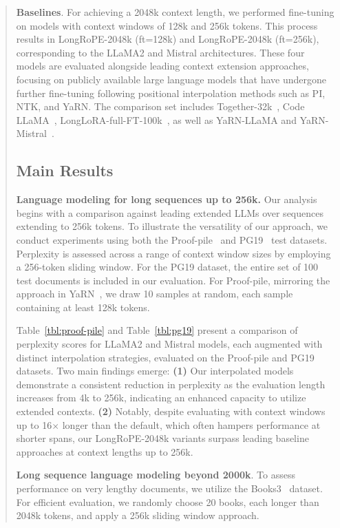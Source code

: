 \begin{abstract}
\textbf{Baselines}. For achieving a 2048k context length, we performed fine-tuning on models with context windows of 128k and 256k tokens. This process results in LongRoPE-2048k (ft=128k) and LongRoPE-2048k (ft=256k), corresponding to the LLaMA2 and Mistral architectures. These four models are evaluated alongside leading context extension approaches, focusing on publicly available large language models that have undergone further fine-tuning following positional interpolation methods such as PI, NTK, and YaRN. The comparison set includes Together-32k~\cite{together}, Code LLaMA~\cite{codellama}, LongLoRA-full-FT-100k~\cite{longlora}, as well as YaRN-LLaMA and YaRN-Mistral~\cite{yarn}.

\subsection{Main Results}

\label{sec:mainresult}
\textbf{Language modeling for long sequences up to 256k.} Our analysis begins with a comparison against leading extended LLMs over sequences extending to 256k tokens. To illustrate the versatility of our approach, we conduct experiments using both the Proof-pile~\cite{pg19} and PG19~\cite{pile} test datasets. Perplexity is assessed across a range of context window sizes by employing a 256-token sliding window. For the PG19 dataset, the entire set of 100 test documents is included in our evaluation. For Proof-pile, mirroring the approach in YaRN~\cite{yarn}, we draw 10 samples at random, each sample containing at least 128k tokens.

Table~\ref{tbl:proof-pile} and Table~\ref{tbl:pg19} present a comparison of perplexity scores for LLaMA2 and Mistral models, each augmented with distinct interpolation strategies, evaluated on the Proof-pile and PG19 datasets. Two main findings emerge: \textbf{(1)} Our interpolated models demonstrate a consistent reduction in perplexity as the evaluation length increases from 4k to 256k, indicating an enhanced capacity to utilize extended contexts. \textbf{(2)} Notably, despite evaluating with context windows up to 16$\times$ longer than the default, which often hampers performance at shorter spans, our LongRoPE-2048k variants surpass leading baseline approaches at context lengths up to 256k.

\textbf{Long sequence language modeling beyond 2000k}. To assess performance on very lengthy documents, we utilize the Books3~\cite{pile} dataset. For efficient evaluation, we randomly choose 20 books, each longer than 2048k tokens, and apply a 256k sliding window approach.


\end{abstract}
